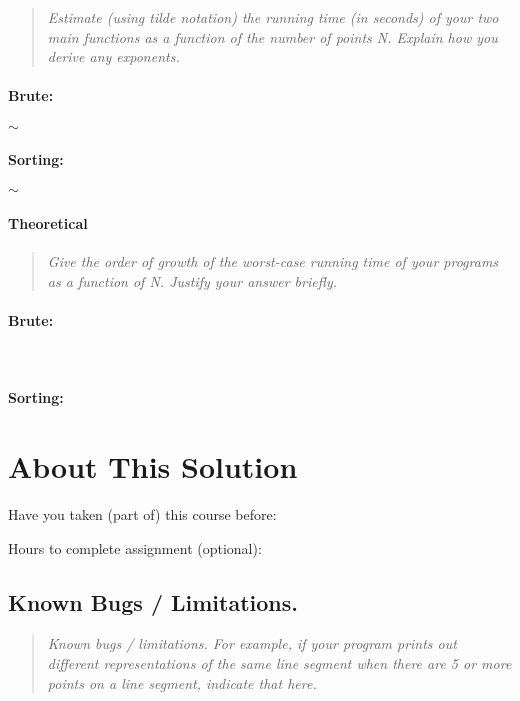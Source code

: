 \documentclass[11pt,a4paper,notitlepage]{article}
\newcommand{\explanation}[1]{\begin{quote}\emph{#1} \end{quote}}  %
\begin{document}
\explanation{
 Estimate (using tilde notation) the running time (in seconds) of
 your two main functions as a function of the number of points N.
% 
  Explain how you derive any exponents.}

\paragraph{Brute:} \quad $\sim $
\bigskip

\paragraph{Sorting:} $\sim$


\paragraph{Theoretical}
\explanation{Give the order of growth of the worst-case running
                 time of your programs as a function of N. Justify
                 your answer briefly.}

\paragraph{Brute:} \ 
\bigskip

\paragraph{Sorting:}



\section{About This Solution}

Have you taken (part of) this course before:
\smallskip

Hours to complete assignment (optional):


 
\subsection{Known Bugs / Limitations.}
\explanation{Known bugs / limitations. For example, if your program prints
  out different representations of the same line segment when there
 are 5 or more points on a line segment, indicate that here.}
\end{document}
